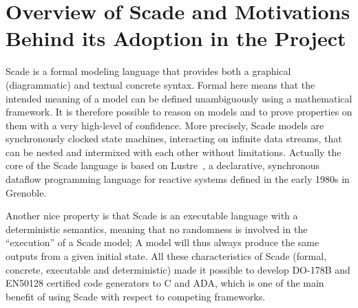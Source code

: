 \documentclass{template/openetcs_report}
\begin{document}


\section{Overview of Scade and Motivations Behind its Adoption in the
  Project}

Scade is a formal modeling language that provides both a graphical
(diagrammatic) and textual concrete syntax. Formal here means that the
intended meaning of a model can be defined unambiguously using a
mathematical framework. It is therefore possible to reason on models
and to prove properties on them with a very high-level of
confidence. More precisely, Scade models are synchronously clocked
state machines, interacting on infinite data streams, that can be
nested and intermixed with each other without limitations. Actually
the core of the Scade language is based on Lustre~\cite{al91}, a
declarative, synchronous dataflow programming language for reactive
systems defined in the early 1980s in Grenoble. 

Another nice property is that Scade is an executable language with a
deterministic semantics, meaning that no randomness is involved in the
``execution'' of a Scade model; A model will thus always produce the
same outputs from a given initial state.  All these characteristics of
Scade (formal, concrete, executable and deterministic) made it
possible to develop DO-178B and EN50128 certified code generators to C
and ADA, which is one of the main benefit of using Scade with respect
to competing frameworks.
\end{document}
